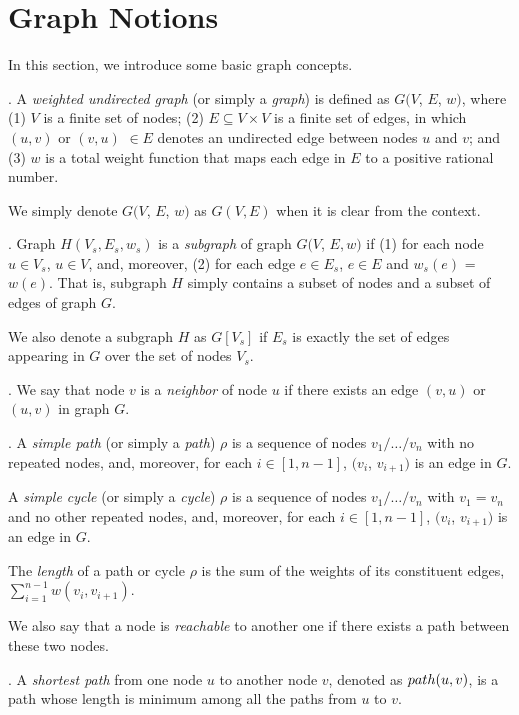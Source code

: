 \section{Graph Notions}
\label{sec-preliminary}

In this section, we introduce some basic graph concepts.

. A {\em weighted undirected graph} (or simply a {\em graph})
is defined as $G (V$, $E$, $w)$, where
(1) $V$ is a finite set of nodes;
(2) $E\subseteq V \times V$ is a finite set of edges, in which $(u, v)$ or $(v, u)$ $\in E$ denotes an undirected edge between nodes $u$ and $v$; and
(3) $w$ is a total weight function that maps each edge in $E$ to a positive rational number.

We simply denote $G (V$, $E$, $w)$ as  $G(V, E)$ when it is clear from the context.

. Graph $H(V_s, E_s,  w_{s})$ is a {\em subgraph} of graph
$G(V$, $E,  w)$ if (1) for each node $u\in V_s$, $u\in V$, and, moreover, (2) for each edge $e\in E_s$, $e\in E$ and $w_{s}(e)$ = $w(e)$.
%
That is, subgraph $H$ simply contains a subset of nodes and a subset of edges of graph $G$.

We also denote a subgraph $H$ as $G[V_s]$ if $E_s$ is exactly the set of edges appearing in $G$ over the set of nodes $V_s$.


. We say that node $v$ is a {\em neighbor} of node $u$ if there exists an edge $(v, u)$ or $(u, v)$ in graph $G$.


.
A {\em simple path} (or simply a {\em path}) $\rho$ is
a sequence of nodes $v_1/\ldots/v_n$ with no repeated nodes, and, moreover, for each $i\in[1, n-1]$, $(v_i$, $v_{i+1})$ is an edge in $G$.

A {\em simple cycle} (or simply a {\em cycle}) $\rho$ is
a sequence of nodes $v_1/\ldots/v_n$ with $v_1 = v_n$ and no other repeated nodes, and, moreover, for each $i\in[1, n-1]$, $(v_i$, $v_{i+1})$ is an edge in $G$.


The {\em length} of a path or cycle $\rho$ is
the sum of the weights of its constituent edges, \ie $\sum_{i=1}^{n-1} w(v_i, v_{i+1})$.


We also say that a node is {\em reachable} to another one if there exists a path between these two nodes.




.
A {\em shortest path} from one node $u$ to another node $v$, denoted as $\path(u, v)$, is a path whose length is minimum among all the paths from $u$ to $v$.

